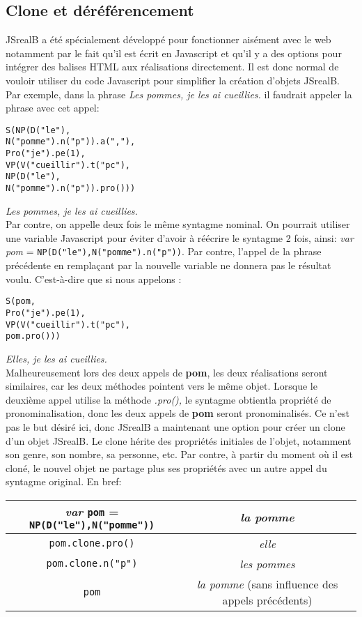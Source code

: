 \documentclass[11pt]{article} %
\newcommand{\real}[1]{\emph{#1}}
\begin{document}
\subsection{Clone et déréférencement}
\label{clone}
JSrealB a été spécialement développé pour fonctionner aisément avec
le web notamment par le fait qu'il est écrit en Javascript et qu'il
y a des options pour intégrer des balises HTML aux réalisations directement.
Il est donc normal de vouloir utiliser du code Javascript pour simplifier
la création d'objets JSrealB. Par exemple, dans la phrase \emph{Les
pommes, je les ai cueillies. }il faudrait appeler la phrase avec cet
appel:
\begin{alltt}
S(NP(D("le"),
     N("pomme").n("p")).a(","),
  Pro("je").pe(1),
  VP(V("cueillir").t("pc"),
     NP(D("le"),
        N("pomme").n("p")).pro()))
\end{alltt}
\real{Les pommes, je les ai cueillies.} \\
Par contre, on appelle deux fois le même syntagme nominal. On pourrait
utiliser une variable Javascript pour éviter d'avoir à réécrire le
syntagme 2 fois, ainsi: \emph{var pom} = \texttt{NP(D("le"),N("pomme").n("p"))}. Par contre, l'appel de la phrase précédente en remplaçant par la
nouvelle variable ne donnera pas le résultat voulu. C'est-à-dire que
si nous appelons : 
\begin{alltt}
S(pom,
  Pro("je").pe(1),
  VP(V("cueillir").t("pc"),
     pom.pro()))
\end{alltt}
\real{Elles, je les ai cueillies.}\\
Malheureusement lors des deux appels de \textbf{pom}, les deux réalisations
seront similaires, car les deux méthodes pointent vers le même objet.
Lorsque le deuxième appel utilise la méthode \emph{.pro(),} le syntagme
obtientla propriété de pronominalisation, donc les deux appels de
\textbf{pom} seront pronominalisés. Ce n'est pas le but désiré ici,
donc JSrealB a maintenant une option pour créer un clone d'un objet
JSrealB. Le clone hérite des propriétés initiales de l'objet, notamment
son genre, son nombre, sa personne, etc. Par contre, à partir du moment
où il est cloné, le nouvel objet ne partage plus ses propriétés avec
un autre appel du syntagme original. En bref: \\
\begin{tabular}{|c|c|}
\hline 
\emph{var} \texttt{pom} = \texttt{NP(D("le"),N("pomme"))} & \real{la pomme}\\
\hline 
\hline 
\texttt{pom.clone.pro()} & \real{elle}\\
\hline 
\texttt{pom.clone.n("p")} & \real{les pommes}\\
\hline 
\texttt{pom} & \real{la pomme} {\small{}(sans influence des appels
précédents)}\\
\hline 
\end{tabular} 
\end{document}
